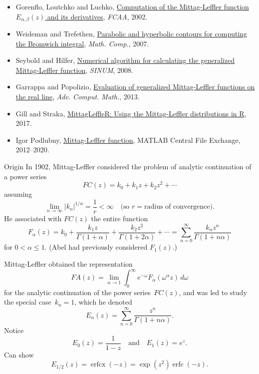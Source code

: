 \documentclass{beamer}
\begin{document}
\begin{frame}
\begin{itemize}
\item Gorenflo, Loutchko and Luchko, 
\href{http://citeseerx.ist.psu.edu/viewdoc/summary?doi=10.1.1.501.3682}%
{Computation of the Mittag-Leffler function $E_{\alpha,\beta}(z)$ and its 
derivatives}, \emph{FCAA}, 2002.
\item Weideman and Trefethen, 
\href{https://www.ams.org/journals/mcom/2007-76-259/S0025-5718-07-01945-X/}%
{Parabolic and hyperbolic contours for computing the Bromwich integral},
\emph{Math. Comp.}, 2007.
\item Seybold and Hilfer, 
\href{https://epubs.siam.org/doi/10.1137/070700280}%
{Numerical algorithm for calculating the generalized Mittag-Leffler function},
\emph{SINUM}, 2008.
\item Garrappa and Popolizio, 
\href{https://link.springer.com/article/10.1007/s10444-012-9274-z}%
{Evaluation of generalized Mittag-Leffler functions on the real line},
\emph{Adv. Comput. Math.}, 2013.
\item Gill and Straka, 
\href{https://strakaps.github.io/MittagLeffleR/}%
{MittagLeffleR: Using the Mittag-Leffler distributions in R}, 2017.
\item  Igor Podlubny,
\href{https://www.mathworks.com/matlabcentral/fileexchange/%
8738-mittag-leffler-function}%
{Mittag-Leffler function}, MATLAB Central File Exchange, 2012--2020. 
\end{itemize}
\end{frame}
\begin{frame}{Origin}
In 1902, Mittag-Leffler considered the problem of analytic continuation of a
power series
\[
FC(z)=k_0+k_1z+k_2z^2+\cdots
\]
assuming
\[
\lim_{n\to\infty}|k_n|^{1/n}=\frac{1}{r}<\infty
\quad\text{(so $r=\text{radius of convergence}$).}
\]
He associated with $FC(z)$ the entire function
\[
F_\alpha(z)=k_0+\frac{k_1z}{\Gamma(1+\alpha)}+\frac{k_2z^2}{\Gamma(1+2\alpha)}
    +\cdots=\sum_{n=0}^\infty\frac{k_nz^n}{\Gamma(1+n\alpha)}
\]
for $0<\alpha\le1$.  (Abel had previously considered $F_1(z)$.)
\end{frame}
\begin{frame}
Mittag-Leffler obtained the representation
\[
FA(z)=\lim_{\alpha\to1}\int_0^\infty 
    e^{-\omega}F_\alpha(\omega^\alpha z)\,d\omega
\]
for the analytic continuation of the power series~$FC(z)$, and was led to study 
the special case~$k_n=1$, which he denoted
\[
E_\alpha(z)=\sum_{n=0}^\infty\frac{z^n}{\Gamma(1+n\alpha)}.
\]
Notice
\[
E_0(z)=\frac{1}{1-z}\quad\text{and}\quad
E_1(z)=e^z.
\]
Can show
\[
E_{1/2}(z)=\operatorname{erfcx}(-z)=\exp(z^2)\operatorname{erfc}(-z).
\]
\end{frame}
\end{document}
